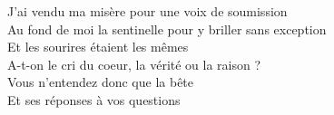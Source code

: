 J'ai vendu ma misère pour une voix de soumission \\
Au fond de moi la sentinelle pour y briller sans exception \\
Et les sourires étaient les mêmes \\

A-t-on le cri du coeur, la vérité ou la raison ? \\
Vous n'entendez donc que la bête \\
Et ses réponses à vos questions\\
